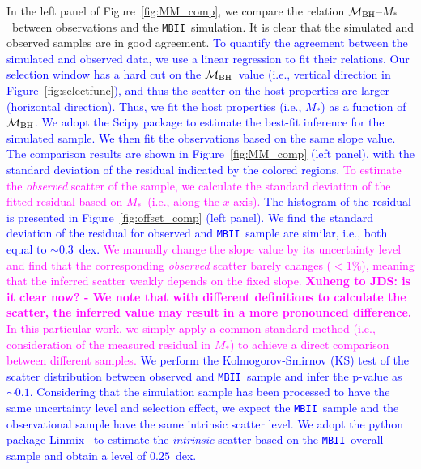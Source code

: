 \documentclass[twocolumn,trackchanges]{aastex63}
\newcommand{\mbh}{$\mathcal M_{\rm BH}$}
\newcommand{\mstar}{{$M_*$}}
\newcommand{\mbii}{\texttt{MBII}}
\newcommand{\blue}[1]{{ \textcolor{blue}{#1}}}
\newcommand{\pink}[1]{{ \textcolor{magenta}{#1}}}
\begin{document}
In the left panel of Figure~\ref{fig:MM_comp}, we compare the relation \mbh--\mstar~between observations and the \mbii\ simulation. It is clear that the simulated and observed samples are in good agreement. 
\blue{To quantify the agreement between the simulated and observed data, we use a linear regression to fit their relations. Our selection window has a hard cut on the \mbh\ value (i.e., vertical direction in Figure~\ref{fig:selectfunc}), and thus the scatter on the host properties are larger (horizontal direction). Thus, we fit the host properties (i.e., \mstar) as a function of \mbh. We adopt the {\sc Scipy} package to estimate the best-fit inference for the simulated sample. We then fit the observations based on the same slope value. The comparison results are shown in Figure~\ref{fig:MM_comp} (left panel), with the standard deviation of the residual indicated by the colored regions.}
\pink{To estimate the {\it observed} scatter of the sample, we calculate the standard deviation of the fitted residual based on \mstar\ (i.e., along the $x$-axis).}\blue{The histogram of the residual is presented in Figure~\ref{fig:offset_comp} (left panel). We find the standard deviation of the residual for observed and \mbii\ sample are similar, i.e., both equal to $\sim0.3$~dex.}\pink{We manually change the slope value by its uncertainty level and find that the corresponding {\it observed} scatter barely changes ($<1\%$), meaning that the inferred scatter weakly depends on the fixed slope. {\bf Xuheng to JDS: is it clear now? - We note that with different definitions to calculate the scatter, the inferred value may result in a more pronounced difference.} In this particular work, we simply apply a common standard method (i.e., consideration of the measured residual in \mstar) to achieve a direct comparison between different samples.} \blue{We perform the Kolmogorov-Smirnov (KS) test of the scatter distribution between observed and \mbii\ sample and infer the p-value as $\sim0.1$. Considering that the simulation sample has been processed to have the same uncertainty level and selection effect, we expect the \mbii\ sample and the observational sample have the same intrinsic scatter level. We adopt the python package {\sc Linmix}~\citep{Kelly2007} to estimate the {\it intrinsic} scatter based on the \mbii\ overall sample and obtain a level of $0.25$~dex.
}
\end{document}
